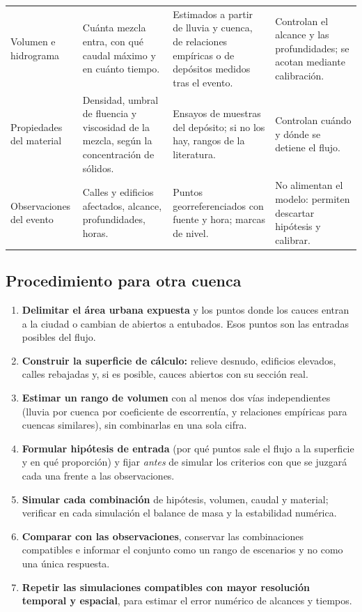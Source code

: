 \begin{table}[htbp]
\begin{tabular}{p{}p{}p{}p{}}
Volumen e hidrograma & Cuánta mezcla entra, con qué caudal máximo y en cuánto tiempo. & Estimados a partir de lluvia y cuenca, de relaciones empíricas o de depósitos medidos tras el evento. & Controlan el alcance y las profundidades; se acotan mediante calibración.\\
Propiedades del material & Densidad, umbral de fluencia y viscosidad de la mezcla, según la concentración de sólidos. & Ensayos de muestras del depósito; si no los hay, rangos de la literatura. & Controlan cuándo y dónde se detiene el flujo.\\
Observaciones del evento & Calles y edificios afectados, alcance, profundidades, horas. & Puntos georreferenciados con fuente y hora; marcas de nivel. & No alimentan el modelo: permiten descartar hipótesis y calibrar.\\
\bottomrule\end{tabular}\end{table}

\subsection*{Procedimiento para otra cuenca}
\begin{enumerate}
\item \textbf{Delimitar el área urbana expuesta} y los puntos donde los cauces entran a la ciudad o cambian de abiertos a entubados. Esos puntos son las entradas posibles del flujo.
\item \textbf{Construir la superficie de cálculo:} relieve desnudo, edificios elevados, calles rebajadas y, si es posible, cauces abiertos con su sección real.
\item \textbf{Estimar un rango de volumen} con al menos dos vías independientes (lluvia por cuenca por coeficiente de escorrentía, y relaciones empíricas para cuencas similares), sin combinarlas en una sola cifra.
\item \textbf{Formular hipótesis de entrada} (por qué puntos sale el flujo a la superficie y en qué proporción) y fijar \emph{antes} de simular los criterios con que se juzgará cada una frente a las observaciones.
\item \textbf{Simular cada combinación} de hipótesis, volumen, caudal y material; verificar en cada simulación el balance de masa y la estabilidad numérica.
\item \textbf{Comparar con las observaciones}, conservar las combinaciones compatibles e informar el conjunto como un rango de escenarios y no como una única respuesta.
\item \textbf{Repetir las simulaciones compatibles con mayor resolución temporal y espacial}, para estimar el error numérico de alcances y tiempos.
\end{enumerate}

